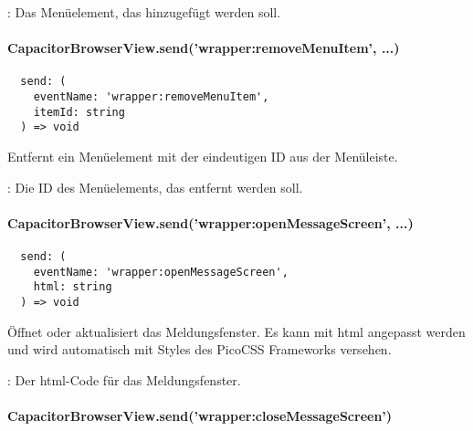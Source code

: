 \begin{arguments}
  \item {}: Das Menüelement, das hinzugefügt werden soll.
\end{arguments}


\paragraph{CapacitorBrowserView.send('wrapper:removeMenuItem', ...)}

\begin{verbatim}
  send: (
    eventName: 'wrapper:removeMenuItem',
    itemId: string
  ) => void
\end{verbatim}

Entfernt ein Menüelement mit der eindeutigen ID  aus der Menüleiste.

\begin{arguments}
  \item {}: Die ID des Menüelements, das entfernt werden soll.
\end{arguments}


\paragraph{CapacitorBrowserView.send('wrapper:openMessageScreen', ...)}

\begin{verbatim}
  send: (
    eventName: 'wrapper:openMessageScreen',
    html: string
  ) => void
\end{verbatim}

Öffnet oder aktualisiert das Meldungsfenster.
Es kann mit \ac{html} angepasst werden und wird automatisch mit Styles des PicoCSS Frameworks versehen.

\begin{arguments}
  \item {}: Der \ac{html}-Code für das Meldungsfenster.
\end{arguments}


\newpage

\paragraph{CapacitorBrowserView.send('wrapper:closeMessageScreen')}

